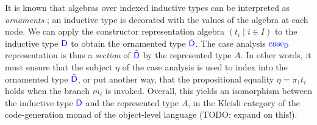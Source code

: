 It is known that algebras over indexed inductive types can be interpreted as
\emph{ornaments} \cite{Dagand2017-nj}; an inductive type is decorated with the
values of the algebra at each node. We can apply the constructor representation
algebra $(t_i \mid i \in I)$ to the inductive type ${\color{blue}{\mathsf{D}}}$ to obtain the
ornamented type $\tilde{{\color{blue}{\mathsf{D}}}}$. The case analysis ${\color{blue}{\mathsf{\textrm{case}_{D}}}}$
representation is thus a \emph{section} of $\tilde{{\color{blue}{\mathsf{D}}}}$ by the represented
type $A$. In other words, it must ensure that the subject $\eta$ of the case
analysis is used to index into the ornamented type $\tilde{{\color{blue}{\mathsf{D}}}}$, or put
another way, that the propositional equality $\eta = \pi_1 t_i$ holds when the
branch $m_i$ is invoked. Overall, this yields an isomorphism between the
inductive type ${\color{blue}{\mathsf{D}}}$ and the represented type $A$, in the Kleisli category
of the code-generation monad of the object-level language (TODO: expand on
this!).

